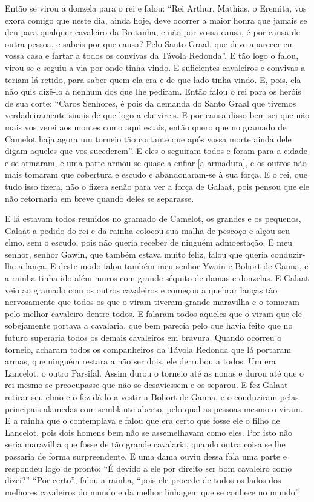 Então se virou a donzela para o rei e falou: “Rei Arthur, Mathias, o Eremita, vos
exora comigo que neste dia, ainda hoje, deve ocorrer a maior honra que jamais
se deu para qualquer cavaleiro da Bretanha, e não por vossa causa, é por causa
de outra pessoa, e sabeis por que causa? Pelo Santo Graal, que deve aparecer em
vossa casa e fartar a todos os convivas da Távola Redonda”. E
tão logo o falou, virou-se e seguiu a via por onde tinha vindo. E suficientes
cavaleiros e convivas a teriam lá retido, para saber quem ela era e de que lado
tinha vindo. E, pois, ela não quis dizê-lo a nenhum dos que lhe pediram. Então
falou o rei para os heróis de sua corte: “Caros Senhores, é pois da demanda do
Santo Graal que tivemos verdadeiramente sinais de que logo a ela vireis. E por
causa disso bem sei que não mais vos verei aos montes como aqui estais, então
quero que no gramado de Camelot haja agora um torneio tão cortante que após
vossa morte ainda dele digam aqueles que vos sucederem”. E eles o seguiram
todos e foram para a cidade e se armaram, e uma parte armou-se quase a enfiar [a armadura],
e os outros não mais tomaram que cobertura e escudo e abandonaram-se à sua
força. E o rei, que tudo isso fizera, não o fizera senão para ver a força de
Galaat, pois pensou que ele não retornaria em breve quando deles se separasse. 

E lá estavam todos reunidos no gramado de Camelot, os grandes e os pequenos,
Galaat a pedido do rei e da rainha colocou sua malha de pescoço e alçou seu
elmo, sem o escudo, pois não queria receber de ninguém admoestação. E meu
senhor, senhor Gawin, que também estava muito feliz, falou que queria
conduzir-lhe a lança. E deste modo falou também meu senhor Ywain e Bohort de
Ganna, e a rainha tinha ido além-muros com grande séquito de damas e donzelas. 
E Galaat veio ao gramado com os outros cavaleiros e começou a quebrar
lanças tão nervosamente que todos os que o viram tiveram grande maravilha e o
tomaram pelo melhor cavaleiro dentre todos. E falaram todos aqueles que o viram
que ele sobejamente portava a cavalaria, que bem parecia pelo que havia feito
que no futuro superaria todos os demais cavaleiros em bravura. Quando ocorreu o
torneio, acharam todos os companheiros da Távola Redonda que lá portaram armas,
que ninguém restara a não ser dois, ele derrubou a todos. Um era Lancelot, o
outro Parsifal. Assim durou o torneio até as nonas e durou até que o rei mesmo
se preocupasse que não se desaviessem e os separou. E fez Galaat retirar seu
elmo e o fez dá-lo a vestir a Bohort de Ganna, e o conduziram pelas
principais alamedas com semblante aberto, pelo qual as pessoas mesmo o viram. E
a rainha que o contemplava e falou que era certo que fosse ele o filho de
Lancelot, pois dois homens bem não se assemelhavam como eles. Por isto não
seria maravilha que fosse de tão grande cavalaria, quando outra coisa se lhe
passaria de forma surpreendente. E uma dama ouviu dessa fala uma parte e
respondeu logo de pronto: “É devido a ele por direito ser bom cavaleiro como
dizei?” “Por certo”, falou a rainha, “pois ele procede de todos os lados dos
melhores cavaleiros do mundo e da melhor linhagem que se conhece no mundo”. 

